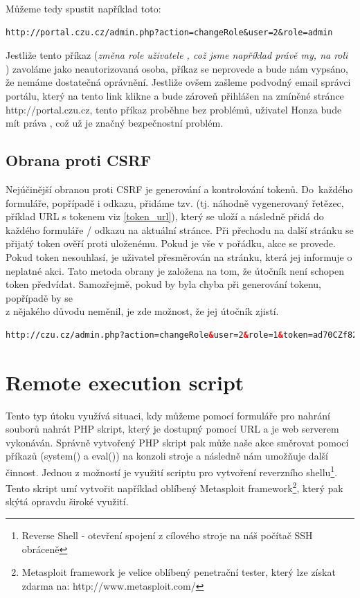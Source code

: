 Můžeme tedy spustit například toto:
\begin{lstlisting}[label=csfr_example1,caption=URL změny uživatelské role]
http://portal.czu.cz/admin.php?action=changeRole&user=2&role=admin
\end{lstlisting}

Jestliže tento příkaz (\textit{změna role uživatele , což jsme například právě my, na roli }) zavoláme jako neautorizovaná osoba, příkaz se neprovede a bude nám vypsáno, že nemáme dostatečná oprávnění. Jestliže ovšem zašleme podvodný email správci portálu, který na tento link klikne a bude zároveň přihlášen na zmíněné stránce {http://portal.czu.cz}, tento příkaz proběhne bez problémů, uživatel Honza bude mít práva , což už je značný bezpečnostní problém.

\subsection{Obrana proti CSRF}
Nejúčinější obranou proti CSRF je generování a kontrolování tokenů. Do~každého formuláře, popřípadě i odkazu, přidáme tzv.  (tj. náhodně vygenerovaný řetězec, příklad URL s tokenem viz \ref{token_url}), který se uloží a následně přidá do každého formuláře / odkazu na aktuální stránce. Při přechodu na další stránku se přijatý token ověří proti uloženému. Pokud je vše v pořádku, akce se provede. Pokud token nesouhlasí, je uživatel přesměrován na  stránku, která jej informuje o neplatné akci. Tato metoda obrany je založena na tom, že útočník není schopen token předvídat. Samozřejmě, pokud by byla chyba při generování tokenu, popřípadě by se \\z nějakého důvodu neměnil, je zde možnost, že jej útočník zjistí.

\begin{lstlisting}[label=token_url,language=HTML, caption=CSRF obrana - token]
http://czu.cz/admin.php?action=changeRole&user=2&role=1&token=ad70CZf82
\end{lstlisting}

\section{Remote execution script}
Tento typ útoku využívá situaci, kdy můžeme pomocí formuláře pro nahrání souborů nahrát PHP skript, který je dostupný pomocí URL a je web serverem vykonáván. Správně vytvořený PHP skript pak může naše akce směrovat pomocí příkazů (system() a eval()) na konzoli stroje a následně nám umožňuje další činnost. Jednou z možností je využití scriptu pro vytvoření reverzního shellu\footnote{Reverse Shell - otevření spojení z cílového stroje na náš počítač  SSH obráceně}. Tento skript umí vytvořit například oblíbený Metasploit framework\footnote{Metasploit framework je velice oblíbený penetrační tester, který lze získat zdarma na: http://www.metasploit.com/}, který pak skýtá opravdu široké využití.

